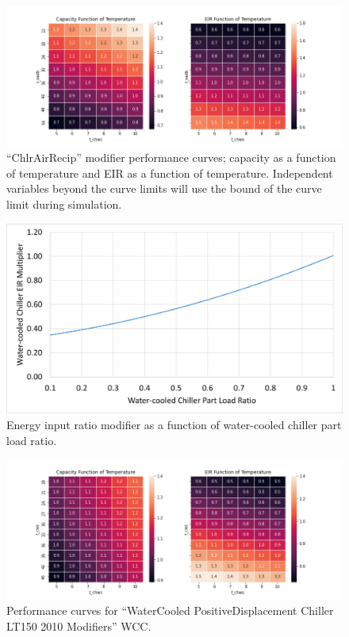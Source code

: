 \begin{figure}
    \centering \includegraphics[width=1.0\textwidth]{figures/ChlrAirRecipQRatio_Modifiers.png}
    \caption["ChlrAirRecip" modifier performance curves]{``ChlrAirRecip'' modifier performance curves; capacity as a function of temperature and EIR as a function of temperature. Independent variables beyond the curve limits will use the bound of the curve limit during simulation.}
    \label{fig:ChlrAirRecipQRatio_curves}
\end{figure}

\begin{figure}
    \centering \includegraphics[width=1.0\textwidth]{figures/wcc_plr.png}
    \caption{Energy input ratio modifier as a function of water-cooled chiller part load ratio.}
    \label{fig:wcc_plr}
\end{figure}

\begin{figure}
    \centering \includegraphics[width=1.0\textwidth]{figures/WaterCooled_PositiveDisplacement_Chiller_LT150_2010_Modifiers.png}
    \caption[Performance curves for WCC]{Performance curves for ``WaterCooled PositiveDisplacement Chiller LT150 2010 Modifiers'' WCC.}
    \label{fig:wcc_WaterCooled_PositiveDisplacement_Chiller_LT150_2010_Modifiers}
\end{figure}

